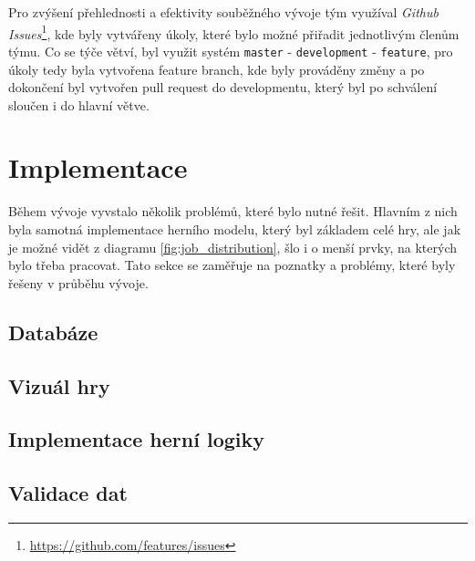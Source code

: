 Pro zvýšení přehlednosti a efektivity souběžného vývoje tým využíval \textit{Github Issues}\footnote{\href{https://github.com/features/issues}{https://github.com/features/issues}}, kde byly vytvářeny úkoly, které bylo možné přiřadit jednotlivým členům týmu. Co se týče větví, byl využit systém \texttt{master} - \texttt{development} - \texttt{feature}, pro úkoly tedy byla vytvořena feature branch, kde byly prováděny změny a po dokončení byl vytvořen pull request do developmentu, který byl po schválení sloučen i do hlavní větve.


\section{Implementace}
\label{sec:implementation}

Během vývoje vyvstalo několik problémů, které bylo nutné řešit. Hlavním z nich byla samotná implementace herního modelu, který byl základem celé hry, ale jak je možné vidět z diagramu \ref{fig:job_distribution}, šlo i o menší prvky, na kterých bylo třeba pracovat. Tato sekce se zaměřuje na poznatky a problémy, které byly řešeny v průběhu vývoje.

\subsection{Databáze}
\label{subsec:database}

\subsection{Vizuál hry}
\label{subsec:game_visuals}

\subsection{Implementace herní logiky}
\label{subsec:game_logic}

\subsection{Validace dat}
\label{subsec:validation}

